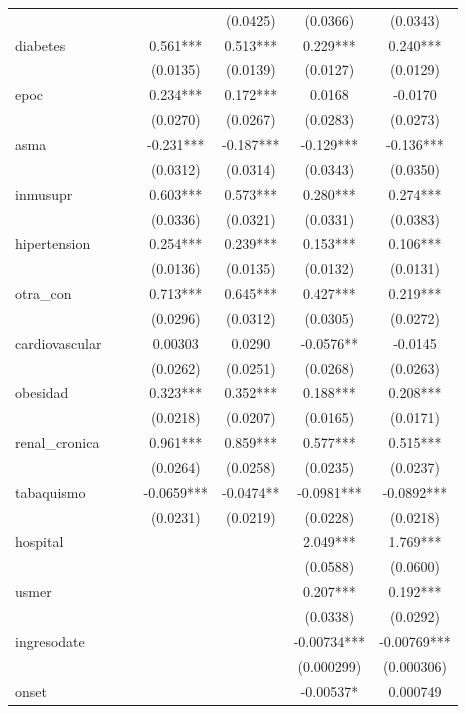 \documentclass[]{article}
\begin{document}
\begin{tabular}{lcccccc}
 &  &  &  & (0.0425) & (0.0366) & (0.0343) \\
diabetes &  &  & 0.561*** & 0.513*** & 0.229*** & 0.240*** \\
 &  &  & (0.0135) & (0.0139) & (0.0127) & (0.0129) \\
epoc &  &  & 0.234*** & 0.172*** & 0.0168 & -0.0170 \\
 &  &  & (0.0270) & (0.0267) & (0.0283) & (0.0273) \\
asma &  &  & -0.231*** & -0.187*** & -0.129*** & -0.136*** \\
 &  &  & (0.0312) & (0.0314) & (0.0343) & (0.0350) \\
inmusupr &  &  & 0.603*** & 0.573*** & 0.280*** & 0.274*** \\
 &  &  & (0.0336) & (0.0321) & (0.0331) & (0.0383) \\
hipertension &  &  & 0.254*** & 0.239*** & 0.153*** & 0.106*** \\
 &  &  & (0.0136) & (0.0135) & (0.0132) & (0.0131) \\
otra\_con &  &  & 0.713*** & 0.645*** & 0.427*** & 0.219*** \\
 &  &  & (0.0296) & (0.0312) & (0.0305) & (0.0272) \\
cardiovascular &  &  & 0.00303 & 0.0290 & -0.0576** & -0.0145 \\
 &  &  & (0.0262) & (0.0251) & (0.0268) & (0.0263) \\
obesidad &  &  & 0.323*** & 0.352*** & 0.188*** & 0.208*** \\
 &  &  & (0.0218) & (0.0207) & (0.0165) & (0.0171) \\
renal\_cronica &  &  & 0.961*** & 0.859*** & 0.577*** & 0.515*** \\
 &  &  & (0.0264) & (0.0258) & (0.0235) & (0.0237) \\
tabaquismo &  &  & -0.0659*** & -0.0474** & -0.0981*** & -0.0892*** \\
 &  &  & (0.0231) & (0.0219) & (0.0228) & (0.0218) \\
hospital &  &  &  &  & 2.049*** & 1.769*** \\
 &  &  &  &  & (0.0588) & (0.0600) \\
usmer &  &  &  &  & 0.207*** & 0.192*** \\
 &  &  &  &  & (0.0338) & (0.0292) \\
ingresodate &  &  &  &  & -0.00734*** & -0.00769*** \\
 &  &  &  &  & (0.000299) & (0.000306) \\
onset &  &  &  &  & -0.00537* & 0.000749 \\

\end{tabular}
\end{document}
